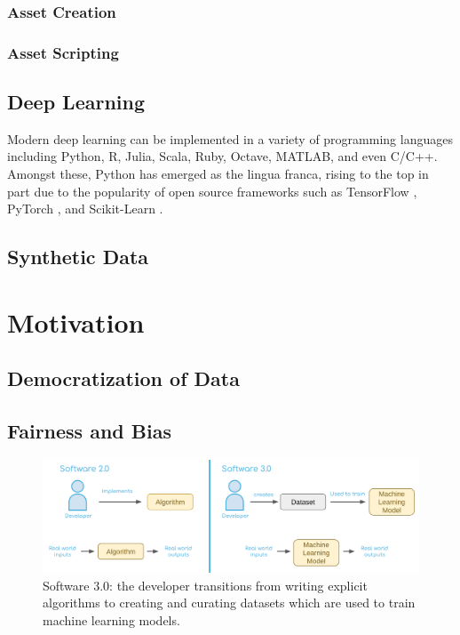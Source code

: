 \documentclass{article}
\begin{document}
\subsubsection{Asset Creation}
\lipsum[5]

\subsubsection{Asset Scripting}
\lipsum[5]

\subsection{Deep Learning}
Modern deep learning can be implemented in a variety of programming languages including Python, R, Julia,
 Scala, Ruby, Octave, MATLAB, and even C/C++. Amongst these, Python has emerged as the lingua franca,
  rising to the top in part due to the popularity of open source frameworks such as
  TensorFlow \citep{tensorflow}, PyTorch \citep{pytorch}, and Scikit-Learn \citep{scikit-learn}.

\subsection{Synthetic Data}
\lipsum[5]

\section{Motivation}
\label{sec:motivation}

\subsection{Democratization of Data}
\lipsum[2]

\subsection{Fairness and Bias}
\lipsum[2]

\begin{figure}
	\centering
	\includegraphics[width=\textwidth]{software3.png}
	\caption{Software 3.0: the developer transitions from writing explicit algorithms to creating and curating datasets which are used to train machine learning models.}
	\label{fig:fig2}
\end{figure}
\end{document}
